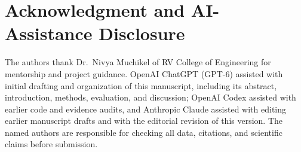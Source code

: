 \documentclass[conference]{IEEEtran}
\begin{document}
\section*{Acknowledgment and AI-Assistance Disclosure}
The authors thank Dr.\ Nivya Muchikel of RV College of Engineering for
mentorship and project guidance. OpenAI ChatGPT
(GPT-6) assisted with initial drafting and organization of this manuscript,
including its abstract, introduction, methods, evaluation, and discussion;
OpenAI Codex assisted with earlier code and evidence audits, and Anthropic
Claude assisted with editing earlier manuscript drafts and with the editorial
revision of this version. The named authors
are responsible for checking all data, citations, and scientific claims before
submission.



\end{document}
